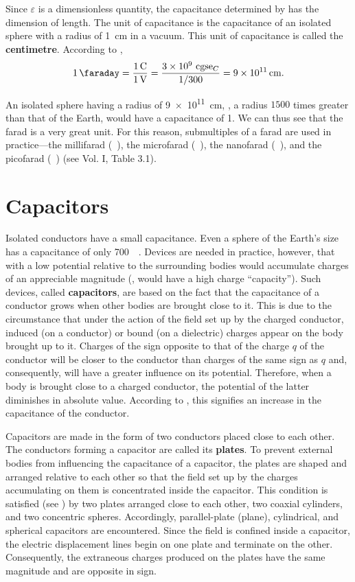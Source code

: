 \noindent
Since $\varepsilon$ is a dimensionless quantity, the capacitance determined by  has the dimension of length. The unit of capacitance is the capacitance of an isolated sphere with a radius of \SI{1}{\centi\metre} in a vacuum. This unit of capacitance is called the \textbf{centimetre}. According to ,
\begin{equation}\label{eq:3_9}
    \SI{1}{\faraday} = \frac{\SI{1}{\coulomb}}{\SI{1}{\volt}} = \frac{\num{3e9}{\cgse{C}}}{1/300} = \SI{9e11}{\centi\metre}.
\end{equation}

An isolated sphere having a radius of \SI{9e11}{\centi\metre}, \ie, a radius $1500$ times greater than that of the Earth, would have a capacitance of \SI{1}{\faraday}. We can thus see that the farad is a very great unit. For this reason, submultiples of a farad are used in practice---the millifarad (\si{\milli\faraday}), the microfarad (\si{\micro\faraday}), the nanofarad (\si{\nano\faraday}), and the picofarad (\si{\pico\faraday}) (see Vol. I, Table 3.1).

\section{Capacitors}\label{sec:3_4}

Isolated conductors have a small capacitance. Even a sphere of the Earth's size has a capacitance of only \SI{700}{\micro\faraday}. Devices are needed in practice, however, that with a low potential relative to the surrounding bodies would accumulate charges of an appreciable magnitude (\ie, would have a high charge ``capacity''). Such devices, called \textbf{capacitors}, are based on the fact that the capacitance of a conductor grows when other bodies are brought close to it. This is due to the circumstance that under the action of the field set up by the charged conductor, induced (on a conductor) or bound (on a dielectric) charges appear on the body brought up to it. Charges of the sign opposite to that of the charge $q$ of the conductor will be closer to the conductor than charges of the same sign as $q$ and, consequently, will have a greater influence on its potential. Therefore, when a body is brought close to a charged conductor, the potential of the latter diminishes in absolute value. According to , this signifies an increase in the capacitance of the conductor.

Capacitors are made in the form of two conductors placed close to each other. The conductors forming a capacitor are called its \textbf{plates}. To prevent external bodies from influencing the capacitance of a capacitor, the plates are shaped and arranged relative to each other so that the field set up by the charges accumulating on them is concentrated inside the capacitor. This condition is satisfied (see ) by two plates arranged close to each other, two coaxial cylinders, and two concentric spheres. Accordingly, parallel-plate (plane), cylindrical, and spherical capacitors are encountered. Since the field is confined inside a capacitor, the electric displacement lines begin on one plate and terminate on the other. Consequently, the extraneous charges produced on the plates have the same magnitude and are opposite in sign.

